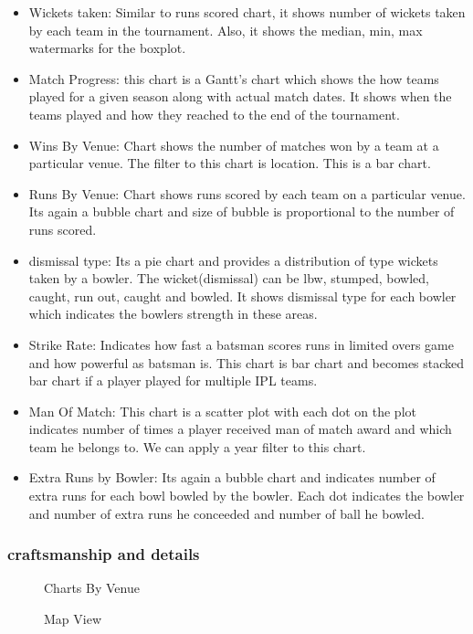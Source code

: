 \documentclass[sigconf]{acmart}
\begin{document}
\begin{itemize}
\item Wickets taken: Similar to runs scored chart, it shows number of wickets taken by each team
in the tournament. Also, it shows the median, min, max watermarks for the boxplot.
\item Match Progress: this chart is a Gantt's chart which shows the how teams played for a given 
season along with actual match dates. It shows when the teams played and how they reached to the
end of the tournament.
\item Wins By Venue: Chart shows the number of matches won by a team at a particular venue.
The filter to this chart is location. This is a bar chart.
\item Runs By Venue: Chart shows runs scored by each team on a particular venue. Its again a
bubble chart and size of bubble is proportional to the number of runs scored.
\item dismissal type: Its a pie chart and provides a distribution of type wickets taken by a bowler.
The wicket(dismissal) can be lbw, stumped, bowled, caught, run out, caught and bowled. It shows 
dismissal type for each bowler which indicates the bowlers strength in these areas.
\item Strike Rate: Indicates how fast a batsman scores runs in limited overs game and how powerful
as batsman is. This chart is bar chart and becomes stacked bar chart if a player played for multiple
IPL teams.
\item Man Of Match: This chart is a scatter plot with each dot on the plot indicates number of times
a player received man of match award and which team he belongs to. We can apply a year filter 
to this chart.
\item Extra Runs by Bowler: Its again a bubble chart and indicates number of extra runs for each bowl
bowled by the bowler. Each dot indicates the bowler and number of extra runs he conceeded and
number of ball he bowled. 
\end{itemize}
\subsubsection{craftsmanship and details}

\begin{figure}[htbp]
\centering
{}
\caption{Charts By Venue}
\label{fig:dashboard}
\end{figure}

\begin{figure}[htbp]
\centering
{}
\caption{Map View}
\label{fig:mapview}
\end{figure}
\end{document}
